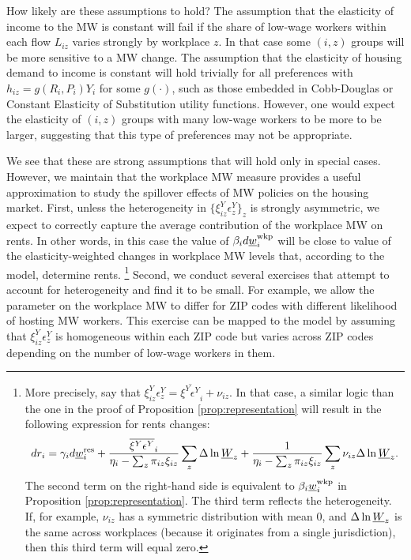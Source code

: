 How likely are these assumptions to hold?
The assumption that the elasticity of income to the MW is constant will fail if 
the share of low-wage workers within each flow $L_{iz}$ varies strongly by 
workplace $z$.
In that case some $(i,z)$ groups will be more sensitive to a MW change.
The assumption that the elasticity of housing demand to income is constant 
will hold trivially for all preferences with
$h_{iz} = g\left(R_i, P_i\right) Y_i$ for some $g\left(\cdot\right)$, such as 
those embedded in Cobb-Douglas or Constant Elasticity of Substitution utility 
functions.
However, one would expect the elasticity of $(i,z)$ groups with many low-wage 
workers to be more to be larger, suggesting that this type of preferences may 
not be appropriate.

We see that these are strong assumptions that will hold only in special cases.
However, we maintain that the workplace MW measure provides a useful 
approximation to study the spillover effects of MW policies on the housing 
market.
First, unless the heterogeneity in $\{\xi_{iz}^Y\epsilon_z^Y\}_z$ is strongly 
asymmetric, 
we expect to correctly capture the average contribution of the workplace MW on
rents.
In other words, in this case the value of $\beta_i  d \underline{w}^{\text{wkp}}_i$ will be 
close to value of the elasticity-weighted changes in workplace MW levels that, 
according to the model, determine rents.%
\footnote{More precisely, say that 
$\xi^Y_{iz}\epsilon_{z}^Y = \overline{\xi^Y\epsilon^Y}_i + \nu_{iz}$.
In that case, a similar logic than the one in the proof of 
Proposition \ref{prop:representation} will result in  the following expression 
for rents changes:
$$
    d r_i = \gamma_i d \underline{w}^{\text{res}}_i
          + \frac{\overline{\xi^Y\epsilon^Y}_i}
                 {\eta_{i} - \sum_z \pi_{iz} \xi_{iz}} \sum_z \Delta \ln \underline{W}_z
          + \frac{1}
                 {\eta_{i} - \sum_z \pi_{iz} \xi_{iz}} \sum_z \nu_{iz} \Delta \ln \underline{W}_z .
$$
The second term on the right-hand side is equivalent to $\beta_i \underline{w}_{i}^{\text{wkp}}$
in Proposition \ref{prop:representation}.
The third term reflects the heterogeneity.
If, for example, $\nu_{iz}$ has a symmetric distribution with mean 0, and
$\Delta \ln \underline{W}_z$ is the same across workplaces (because it originates from
a single jurisdiction), then this third term will equal zero.}
Second, we conduct several exercises that attempt to account for heterogeneity
and find it to be small.
For example, we allow the parameter on the workplace MW to differ for ZIP codes 
with different likelihood of hosting MW workers.
This exercise can be mapped to the model by assuming that 
$\xi^Y_{iz} \epsilon_z^Y$ is homogeneous within each ZIP code but varies
across ZIP codes depending on the number of low-wage workers in them.
